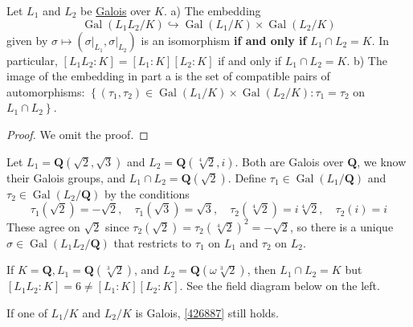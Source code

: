 \begin{theorem}[Theorem 6.1]
Let $L_1$ and $L_2$ be \underline{Galois} over $K$.
a) The embedding
\[
\operatorname{Gal}\left(L_1 L_2 / K\right) \hookrightarrow \operatorname{Gal}\left(L_1 / K\right) \times \operatorname{Gal}\left(L_2 / K\right)
\]given by $\sigma \mapsto\left(\left.\sigma\right|_{L_1},\left.\sigma\right|_{L_2}\right)$ is an isomorphism \textbf{if and only if} $L_1 \cap L_2=K$. In particular, $\left[L_1 L_2: K\right]=\left[L_1: K\right]\left[L_2: K\right]$ if and only if $L_1 \cap L_2=K$.
b) The image of the embedding in part a is the set of compatible pairs of automorphisms: $\left\{\left(\tau_1, \tau_2\right) \in \operatorname{Gal}\left(L_1 / K\right) \times \operatorname{Gal}\left(L_2 / K\right): \tau_1=\tau_2\right.$ on $\left.L_1 \cap L_2\right\}$.\label{426887}
\end{theorem}

\begin{proof}
We omit the proof.
\end{proof}

\begin{example}
Let $L_1=\mathbf{Q}(\sqrt{2}, \sqrt{3})$ and $L_2=\mathbf{Q}(\sqrt[4]{2}, i)$. Both are Galois over $\mathbf{Q}$, we know their Galois groups, and $L_1 \cap L_2=\mathbf{Q}(\sqrt{2})$. Define $\tau_1 \in \operatorname{Gal}\left(L_1 / \mathbf{Q}\right)$ and $\tau_2 \in \operatorname{Gal}\left(L_2 / \mathbf{Q}\right)$ by the conditions
\[
\tau_1(\sqrt{2})=-\sqrt{2}, \quad \tau_1(\sqrt{3})=\sqrt{3}, \quad \tau_2(\sqrt[4]{2})=i \sqrt[4]{2}, \quad \tau_2(i)=i
\]These agree on $\sqrt{2}$ since $\tau_2(\sqrt{2})=\tau_2(\sqrt[4]{2})^2=-\sqrt{2}$, so there is a unique $\sigma \in \operatorname{Gal}\left(L_1 L_2 / \mathbf{Q}\right)$ that restricts to $\tau_1$ on $L_1$ and $\tau_2$ on $L_2$.
\end{example}
\begin{example}
If $K=\mathbf{Q}, L_1=\mathbf{Q}(\sqrt[3]{2})$, and $L_2=\mathbf{Q}(\omega \sqrt[3]{2})$, then $L_1 \cap L_2=K$ but $\left[L_1 L_2: K\right]=6 \neq\left[L_1: K\right]\left[L_2: K\right]$. See the field diagram below on the left.
\end{example}
If one of $L_1/K$ and $L_2/K$ is Galois, \cref{426887} still holds.

